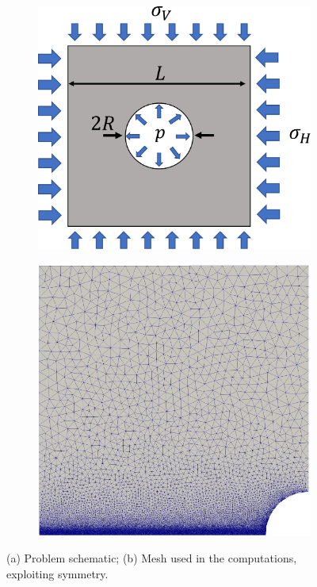 \begin{figure}[h]
\begin{subfigure}{.49\textwidth}
  \centering
  \includegraphics[width=0.8\linewidth]{images/2d_nucleation/cavity_schematic.pdf}
  \caption{}
  \label{fig:cavity_schematic}
\end{subfigure}%
\begin{subfigure}{.49\textwidth}
  \centering
  \includegraphics[width=0.71\linewidth]{images/2d_nucleation/quarter_mesh.pdf}
  \caption{}
  \label{fig:quarter_mesh}
\end{subfigure}%
  \caption{(a) Problem schematic; (b) Mesh used in the computations, exploiting symmetry. } 
  \label{fig:initiation_problem_setup}
\end{figure}

